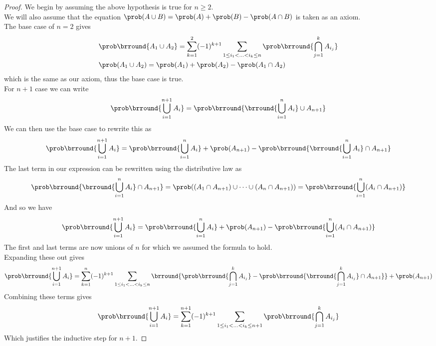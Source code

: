 \begin{proof}
We begin by assuming the above hypothesis is true for $n\geq2$.\\
We will also assume that the equation $\prob(A\cup B)=\prob(A)+\prob(B)-\prob(A\cap B)$ is taken as an axiom.\\
The base case of $n=2$ gives
\begin{align*}
    &\prob\brround{A_1\cup A_2}=\sum_{k=1}^2(-1)^{k+1}\sum_{1\leq i_1<\ldots<i_k\leq n}\prob\brround{\bigcap_{j=1}^k A_{i_j}}\\
    &\prob(A_1\cup A_2)=\prob(A_1)+\prob(A_2)-\prob(A_1\cap A_2)
\end{align*}
which is the same as our axiom, thus the base case is true.\\
For $n+1$ case we can write
\[
\prob\brround{\bigcup_{i=1}^{n+1}A_i}=\prob\brround{\brround{\bigcup_{i=1}^nA_i}\cup A_{n+1}}
\]
We can then use the base case to rewrite this as
\[
\prob\brround{\bigcup_{i=1}^{n+1}A_i}=\prob\brround{\bigcup_{i=1}^nA_i}+\prob(A_{n+1})-\prob\brround{\brround{\bigcup_{i=1}^nA_i}\cap A_{n+1}}
\]
The last term in our expression can be rewritten using the distributive law as
\[
\prob\brround{\brround{\bigcup_{i=1}^nA_i}\cap A_{n+1}}=\prob((A_1\cap A_{n+1})\cup\cdots\cup(A_n\cap A_{n+1}))=\prob\brround{\bigcup_{i=1}^n(A_i\cap A_{n+1})}
\]
And so we have
\[
\prob\brround{\bigcup_{i=1}^{n+1}A_i}=\prob\brround{\bigcup_{i=1}^nA_i}+\prob(A_{n+1})-\prob\brround{\bigcup_{i=1}^n(A_i\cap A_{n+1})}
\]
The first and last terms are now unions of $n$ for which we assumed the formula to hold.\\
Expanding these out gives
\[
\prob\brround{\bigcup_{i=1}^{n+1}A_i}=\sum_{k=1}^n(-1)^{k+1}\sum_{1\leq i_1<\ldots<i_k\leq n}\brround{\prob\brround{\bigcap_{j=1}^kA_{i_j}}-\prob\brround{\brround{\bigcap_{j=1}^kA_{i_j}}\cap A_{n+1}}}+\prob(A_{n+1})
\]
Combining these terms gives
\[
\prob\brround{\bigcup_{i=1}^{n+1}A_i}=\sum_{k=1}^{n+1}(-1)^{k+1}\sum_{1\leq i_1<\ldots<i_k\leq n+1}\prob\brround{\bigcap_{j=1}^kA_{i_j}}
\]
Which justifies the inductive step for $n+1$.
\end{proof}

